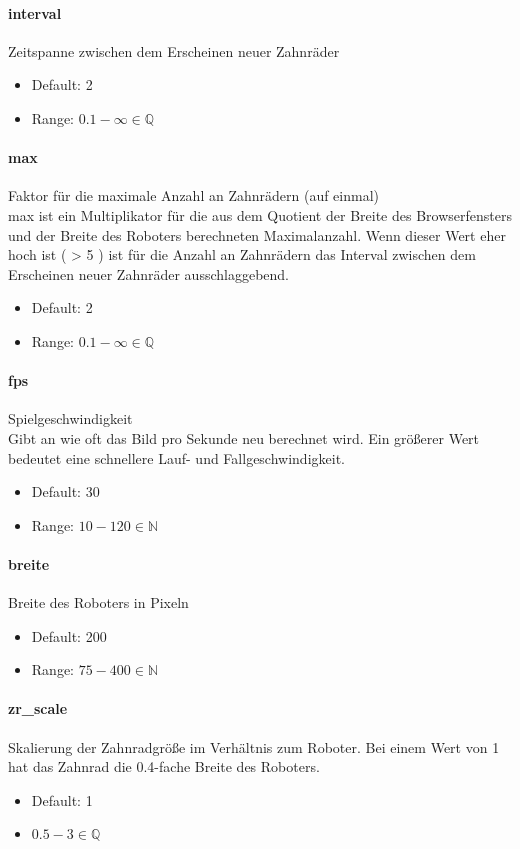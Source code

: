 \documentclass[]{article}
\begin{document}
\begin{multicols}{2}
	\paragraph{interval}  Zeitspanne zwischen dem Erscheinen neuer Zahnräder
	\begin{itemize}
		\item Default: 2
		\item Range: $ 0.1 - \infty \in \mathbb{Q}$
	\end{itemize}
	\paragraph{max}  Faktor für die maximale Anzahl an Zahnrädern (auf einmal) \\
	max ist ein Multiplikator für die aus dem Quotient der Breite des Browserfensters und der Breite des Roboters berechneten Maximalanzahl. Wenn dieser Wert eher hoch ist ( > 5 ) ist für die Anzahl an Zahnrädern das Interval zwischen dem Erscheinen neuer Zahnräder ausschlaggebend.
	\begin{itemize}
		\item Default: 2
		\item Range: $ 0.1 - \infty \in \mathbb{Q}$
	\end{itemize}


	\paragraph{fps}  Spielgeschwindigkeit \\
	Gibt an wie oft das Bild pro Sekunde neu berechnet wird. Ein größerer Wert bedeutet eine schnellere Lauf- und Fallgeschwindigkeit.
	\begin{itemize}

		\item Default: 30
		\item Range: $ 10 - 120 \in \mathbb{N} $

	\end{itemize}
	\paragraph{breite}  Breite des Roboters in Pixeln
	\begin{itemize}
		\item Default: 200
		\item Range: $ 75 - 400  \in \mathbb{N}$
	\end{itemize}
	\paragraph{zr\_scale}  Skalierung der Zahnradgröße im Verhältnis zum Roboter. Bei einem Wert von 1 hat das Zahnrad die 0.4-fache Breite des Roboters.
	\begin{itemize}
		\item Default: 1
		\item $ 0.5 - 3 \in \mathbb{Q} $
	\end{itemize}

 
	\end{multicols}
\end{document}
